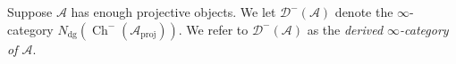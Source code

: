 \documentclass{MetricNotes2023}
\DeclareMathOperator{\Ch}{Ch}
\begin{document}
\begin{ourproof}
\begin{definition}
Suppose \(\mathcal{A}\) has enough projective objects. We let \(\mathcal{D}^-(\mathcal{A})\) denote the \(\infty\)-category \(N_{\text{dg}}(\Ch^-(\mathcal{A}_{\text{proj}}))\). We refer to \(\mathcal{D}^-(\mathcal{A})\) as the \textit{derived \(\infty\)-category of \(\mathcal{A}\)}.  
\end{definition}


\end{ourproof}

\end{document}
